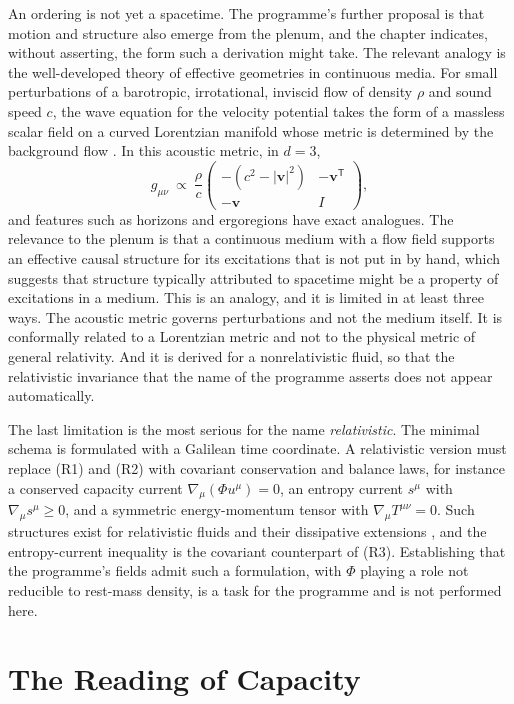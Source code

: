 \documentclass[11pt,twoside,openright]{book}
\theoremstyle{plain}
\theoremstyle{definition}
\theoremstyle{remark}
\begin{document}
An ordering is not yet a spacetime. The programme's further proposal is that motion and structure also emerge from the plenum, and the chapter indicates, without asserting, the form such a derivation might take. The relevant analogy is the well-developed theory of effective geometries in continuous media. For small perturbations of a barotropic, irrotational, inviscid flow of density $\rho$ and sound speed $c$, the wave equation for the velocity potential takes the form of a massless scalar field on a curved Lorentzian manifold whose metric is determined by the background flow \cite{unruh1981,visser1998}. In this acoustic metric, in $d=3$,
\[
g_{\mu\nu}\ \propto\ \frac{\rho}{c}
\begin{pmatrix}-(c^2-|\mathbf{v}|^2) & -\mathbf{v}^{\mathsf T}\\ -\mathbf{v} & I\end{pmatrix},
\]
and features such as horizons and ergoregions have exact analogues. The relevance to the plenum is that a continuous medium with a flow field supports an effective causal structure for its excitations that is not put in by hand, which suggests that structure typically attributed to spacetime might be a property of excitations in a medium. This is an analogy, and it is limited in at least three ways. The acoustic metric governs perturbations and not the medium itself. It is conformally related to a Lorentzian metric and not to the physical metric of general relativity. And it is derived for a nonrelativistic fluid, so that the relativistic invariance that the name of the programme asserts does not appear automatically.

The last limitation is the most serious for the name \emph{relativistic}. The minimal schema is formulated with a Galilean time coordinate. A relativistic version must replace (R1) and (R2) with covariant conservation and balance laws, for instance a conserved capacity current $\nabla_\mu(\Phi u^\mu)=0$, an entropy current $s^\mu$ with $\nabla_\mu s^\mu\ge0$, and a symmetric energy-momentum tensor with $\nabla_\mu T^{\mu\nu}=0$. Such structures exist for relativistic fluids and their dissipative extensions \cite{eckart1940,landau1987}, and the entropy-current inequality is the covariant counterpart of (R3). Establishing that the programme's fields admit such a formulation, with $\Phi$ playing a role not reducible to rest-mass density, is a task for the programme and is not performed here.

\section{The Reading of Capacity}\label{sec:capacity}
\end{document}
